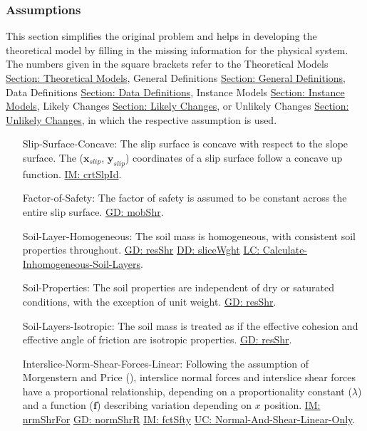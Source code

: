 \documentclass[12pt]{article}
\begin{document}
\subsubsection{Assumptions}
\label{Sec:Assumps}
This section simplifies the original problem and helps in developing the theoretical model by filling in the missing information for the physical system. The numbers given in the square brackets refer to the Theoretical Models \hyperref[Sec:TMs]{Section: Theoretical Models}, General Definitions \hyperref[Sec:GDs]{Section: General Definitions}, Data Definitions \hyperref[Sec:DDs]{Section: Data Definitions}, Instance Models \hyperref[Sec:IMs]{Section: Instance Models}, Likely Changes \hyperref[Sec:LCs]{Section: Likely Changes}, or Unlikely Changes \hyperref[Sec:UCs]{Section: Unlikely Changes}, in which the respective assumption is used.
\begin{itemize}
\item[Slip-Surface-Concave:\phantomsection\label{assumpSSC}]The slip surface is concave with respect to the slope surface. The (${\mathbf{x}_{slip}}$, ${\mathbf{y}_{slip}}$) coordinates of a slip surface follow a concave up function. \hyperref[IM:crtSlpId]{IM: crtSlpId}.
\item[Factor-of-Safety:\phantomsection\label{assumpFOS}]The factor of safety is assumed to be constant across the entire slip surface. \hyperref[GD:mobShr]{GD: mobShr}.
\item[Soil-Layer-Homogeneous:\phantomsection\label{assumpSLH}]The soil mass is homogeneous, with consistent soil properties throughout. \hyperref[GD:resShr]{GD: resShr} \hyperref[DD:sliceWght]{DD: sliceWght} \hyperref[LC_inhomogeneous]{LC: Calculate-Inhomogeneous-Soil-Layers}.
\item[Soil-Properties:\phantomsection\label{assumpSP}]The soil properties are independent of dry or saturated conditions, with the exception of unit weight. \hyperref[GD:resShr]{GD: resShr}.
\item[Soil-Layers-Isotropic:\phantomsection\label{assumpSLI}]The soil mass is treated as if the effective cohesion and effective angle of friction are isotropic properties. \hyperref[GD:resShr]{GD: resShr}.
\item[Interslice-Norm-Shear-Forces-Linear:\phantomsection\label{assumpINSFL}]Following the assumption of Morgenstern and Price (\cite{morgenstern1965}), interslice normal forces and interslice shear forces have a proportional relationship, depending on a proportionality constant ($λ$) and a function ($\mathbf{f}$) describing variation depending on $x$ position. \hyperref[IM:nrmShrFor]{IM: nrmShrFor} \hyperref[GD:normShrR]{GD: normShrR} \hyperref[IM:fctSfty]{IM: fctSfty} \hyperref[UC_normshearlinear]{UC: Normal-And-Shear-Linear-Only}.

\end{itemize}
\end{document}

